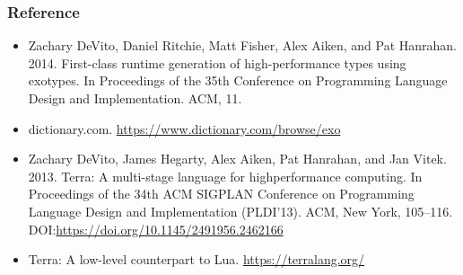 \documentclass{beamer}
\begin{document}
\begin{frame}
	\frametitle{Reference}
  \begin{itemize}
  \item Zachary DeVito, Daniel Ritchie, Matt Fisher, Alex Aiken, and Pat Hanrahan. 2014. First-class runtime generation of high-performance types using exotypes. In Proceedings of the 35th Conference on Programming Language Design and Implementation. ACM, 11.
  \item dictionary.com. \url{https://www.dictionary.com/browse/exo}
  \item Zachary DeVito, James Hegarty, Alex Aiken, Pat Hanrahan, and Jan Vitek. 2013. Terra: A multi-stage language for highperformance computing. In Proceedings of the 34th ACM SIGPLAN Conference on Programming Language Design and Implementation (PLDI’13). ACM, New York, 105–116. DOI:\url{https://doi.org/10.1145/2491956.2462166}
  \item Terra: A low-level counterpart to Lua. \url{https://terralang.org/}
  \end{itemize}
\end{frame}
\end{document}
